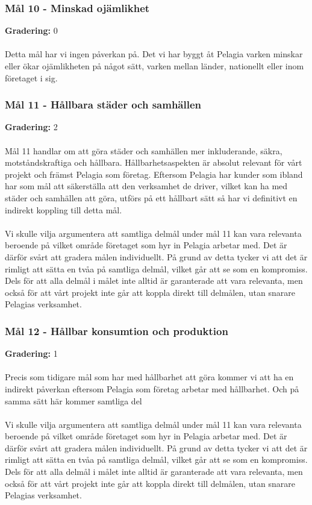 \subsubsection{Mål 10 - Minskad ojämlikhet}
\textbf{Gradering:} 0 
\\\\
Detta mål har vi ingen påverkan på. Det vi har byggt åt Pelagia varken minskar eller ökar ojämlikheten på något sätt, varken mellan länder, nationellt eller inom företaget i sig.

\subsubsection{Mål 11 - Hållbara städer och samhällen}
\textbf{Gradering:} 2 
\\\\
Mål 11 handlar om att göra städer och samhällen mer inkluderande, säkra, motståndskraftiga och hållbara. Hållbarhetsaspekten är absolut relevant för vårt projekt och främst Pelagia som företag. Eftersom Pelagia har kunder som ibland har som mål att säkerställa att den verksamhet de driver, vilket kan ha med städer och samhällen att göra, utförs på ett hållbart sätt så har vi definitivt en indirekt koppling till detta mål.
\\\\
Vi skulle vilja argumentera att samtliga delmål under mål 11 kan vara relevanta beroende på vilket område företaget som hyr in Pelagia arbetar med. Det är därför svårt att gradera målen individuellt. På grund av detta tycker vi att det är rimligt att sätta en tvåa på samtliga delmål, vilket går att se som en kompromiss. Dels för att alla delmål i målet inte alltid är garanterade att vara relevanta, men också för att vårt projekt inte går att koppla direkt till delmålen, utan snarare Pelagias verksamhet.

\subsubsection{Mål 12 - Hållbar konsumtion och produktion}
\textbf{Gradering:} 1 
\\\\
Precis som tidigare mål som har med hållbarhet att göra kommer vi att ha en indirekt påverkan eftersom Pelagia som företag arbetar med hållbarhet. Och på samma sätt här kommer samtliga del
\\\\
Vi skulle vilja argumentera att samtliga delmål under mål 11 kan vara relevanta beroende på vilket område företaget som hyr in Pelagia arbetar med. Det är därför svårt att gradera målen individuellt. På grund av detta tycker vi att det är rimligt att sätta en tvåa på samtliga delmål, vilket går att se som en kompromiss. Dels för att alla delmål i målet inte alltid är garanterade att vara relevanta, men också för att vårt projekt inte går att koppla direkt till delmålen, utan snarare Pelagias verksamhet.
